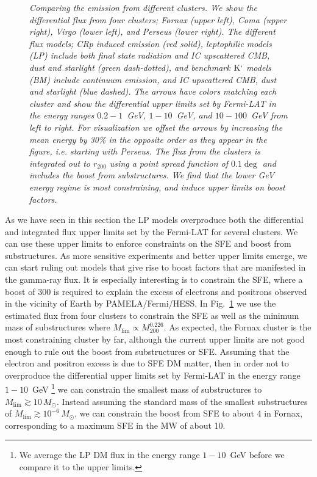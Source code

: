 \documentclass[10pt,aps,pra,reprint,amsmath,amsfonts,amssymb,showpacs]{revtex4-1}
\newcommand{\rmn}{\mathrm}
\newcommand{\msun}{M_\odot}
\newcommand{\Kp}{\rmn{K}`}
\newcommand{\rvir}{r_{200}}
\newcommand{\mvir}{M_{200}}
\begin{document}
\begin{figure}
\begin{minipage}{2.0\columnwidth}
\caption{\it Comparing the emission from different clusters. We show
  the differential flux from four clusters; Fornax (upper left), Coma
  (upper right), Virgo (lower left), and Perseus (lower right). The
  different flux models; CRp induced emission (red solid), leptophilic
  models (LP) include both final state radiation and IC upscattered
  CMB, dust and starlight (green dash-dotted), and benchmark $\Kp$
  models (BM) include continuum emission, and IC upscattered CMB, dust
  and starlight (blue dashed). The arrows have colors matching each
  cluster and show the differential upper limits set by Fermi-LAT in
  the energy ranges $0.2-1$~GeV, $1-10$~GeV, and $10-100$~GeV from
  left to right. For visualization we offset the arrows by increasing
  the mean energy by 30\% in the opposite order as they appear in the
  figure, i.e. starting with Perseus. The flux from the clusters is
  integrated out to $\rvir$ using a point spread function of $0.1\deg$
  and includes the boost from substructures. We find that the lower
  GeV energy regime is most constraining, and induce upper limits on
  boost factors.}
 \label{fig:clu_comp}
\end{minipage}
\end{figure}

As we have seen in this section the LP models overproduce both the
differential and integrated flux upper limits set by the Fermi-LAT for
several clusters. We can use these upper limits to enforce constraints
on the SFE and boost from substructures. As more sensitive experiments
and better upper limits emerge, we can start ruling out models that
give rise to boost factors that are manifested in the gamma-ray
flux. It is especially interesting is to constrain the SFE, where a
boost of 300 is required to explain the excess of electrons and
positrons observed in the vicinity of Earth by PAMELA/Fermi/HESS.  In
Fig.~\ref{fig:clu_comp} we use the estimated flux from four clusters
to constrain the SFE as well as the minimum mass of substructures
where $M_\rmn{lim}\propto\mvir^{0.226}$. As expected, the Fornax
cluster is the most constraining cluster by far, although the current
upper limits are not good enough to rule out the boost from
substructures or SFE. Assuming that the electron and positron excess
is due to SFE DM matter, then in order not to overproduce the
differential upper limits set by Fermi-LAT in the energy range
$1-10$~GeV \footnote{We average the LP DM flux in the energy range
  $1-10$~GeV before we compare it to the upper limits.}  we can
constrain the smallest mass of substructures to $M_\rmn{lim}\gtrsim
10\,\msun$. Instead assuming the standard mass of the smallest
substructures of $M_\rmn{lim}\gtrsim 10^{-6}\,\msun$, we can constrain
the boost from SFE to about 4 in Fornax, corresponding to a maximum
SFE in the MW of about 10.
\end{document}
